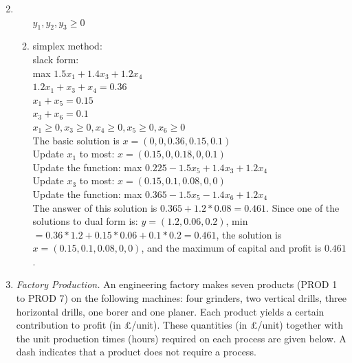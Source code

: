 \documentclass[12pt,a4paper]{article}
\makeatletter
\newtheorem*{solution}{Solution}
\theoremstyle{definition}
\renewenvironment{solution}[1][Solution] {\par\pushQED{\qed}\normalfont\topsep6\p@\@plus6\p@\relax\trivlist\item[\hskip\labelsep\bfseries#1\@addpunct{.}]\ignorespaces}{\popQED\endtrivlist\@endpefalse} \makeatother
\makeatother
\begin{document}
\begin{enumerate}
\begin{solution}
\begin{enumerate}
        \\ $y_1,y_2,y_3\geqslant 0$
        \item simplex method:
        \\ slack form:
        \\ max $1.5x_1+1.4x_3+1.2x_4$
        \\ $1.2x_1+x_3+x_4 = 0.36$
        \\ $x_1 + x_5 = 0.15$
        \\ $x_3 + x_6 = 0.1$
        \\ $x_1\geqslant 0, x_3\geqslant 0, x_4\geqslant 0, x_5\geqslant 0, x_6\geqslant 0$ 
        \\ The basic solution is $x=(0,0,0.36,0.15,0.1)$
        \\ Update $x_1$ to most: $x=(0.15,0,0.18,0,0.1)$
        \\ Update the function: max $0.225-1.5x_5+1.4x_3+1.2x_4$
        \\ Update $x_3$ to most: $x=(0.15,0.1,0.08,0,0)$
        \\ Update the function: max $0.365-1.5x_5-1.4x_6+1.2x_4$
        \\ The answer of this solution is $0.365+1.2*0.08=0.461$. Since one of the solutions to dual form is: $y=(1.2,0.06,0.2)$, min$=0.36*1.2+0.15*0.06+0.1*0.2=0.461$, 
        the solution is $x=(0.15,0.1,0.08,0,0)$, and the maximum of capital and profit is $0.461$.
      \end{enumerate}
    \end{solution}
    \item
    \textit{Factory Production.} An engineering factory makes seven products (PROD 1 to PROD 7) on the following machines: four grinders, two vertical drills, three horizontal drills, one borer and one planer. Each product yields a certain contribution to profit (in \pounds/unit). These quantities (in \pounds/unit) together with the unit production times (hours) required on each process are given below. A dash indicates that a product does not require a process.


\end{enumerate}
\end{document}

